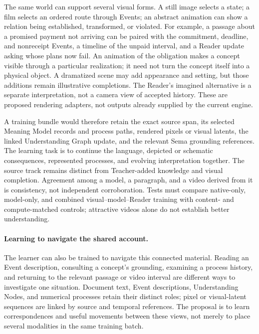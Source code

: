 \documentclass[10pt]{article}
\begin{document}
The same world can support several visual forms. A still image selects a
state; a film selects an ordered route through Events; an abstract animation
can show a relation being established, transformed, or violated. For example,
a passage about a promised payment not arriving can be paired with the
commitment, deadline, and nonreceipt Events, a timeline of the unpaid interval,
and a Reader update asking whose plans now fail. An animation of the
obligation makes a concept visible through a particular realization; it need
not turn the concept itself into a physical object. A dramatized scene may add
appearance and setting, but those additions remain illustrative completions.
The Reader's imagined alternative is a separate interpretation, not a camera
view of accepted history. These are proposed rendering adapters, not outputs
already supplied by the current engine.

A training bundle would therefore retain the exact source span, its selected
Meaning Model records and process paths, rendered pixels or visual latents,
the linked Understanding Graph update, and the relevant Sema grounding
references. The learning task is to continue the language, depicted or
schematic consequences, represented processes, and evolving interpretation
together. The source track remains distinct from Teacher-added knowledge and
visual completion. Agreement among a model, a paragraph, and a video derived
from it is consistency, not independent corroboration. Tests must compare
native-only, model-only, and combined visual--model--Reader training with
content- and compute-matched controls; attractive videos alone do not establish
better understanding.

\paragraph{Learning to navigate the shared account.}
The learner can also be trained to navigate this connected material. Reading
an Event description, consulting a concept's grounding, examining a process
history, and returning to the relevant passage or video interval are different
ways to investigate one situation. Document text, Event descriptions,
Understanding Nodes, and numerical processes retain their distinct roles;
pixel or visual-latent sequences are linked by source and temporal references.
The proposal is to learn correspondences and useful movements between these
views, not merely to place several modalities in the same training batch.
\end{document}
